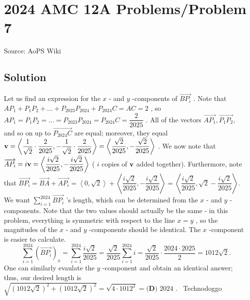 \documentclass[12pt]{article}
\begin{document}
\section*{{2024 AMC 12A Problems/Problem 7}}
Source: AoPS Wiki

\subsection*{Solution}
Let us find an expression for the $x$ - and $y$ -components of $\overrightarrow{BP_i}$ . Note that $AP_1+P_1P_2+\dots+P_{2023}P_{2024}+P_{2024}C=AC=2$ , so $AP_1=P_1P_2=\dots=P_{2023}P_{2024}=P_{2024}C=\dfrac2{2025}$ . All of the vectors $\overrightarrow{AP_1},\overrightarrow{P_1P_2},$ and so on up to $\overrightarrow{P_{2024}C}$ are equal; moreover, they equal $\textbf v=\left\langle\dfrac1{\sqrt2}\cdot\dfrac2{2025},-\dfrac1{\sqrt2}\cdot\dfrac2{2025}\right\rangle=\left\langle\dfrac{\sqrt2}{2025},-\dfrac{\sqrt2}{2025}\right\rangle$ . We now note that $\overrightarrow{AP_i}=i\textbf v=\left\langle\dfrac{i\sqrt2}{2025},-\dfrac{i\sqrt2}{2025}\right\rangle$ ( $i$ copies of $\textbf v$ added together). Furthermore, note that $\overrightarrow{BP_i}=\overrightarrow{BA}+\overrightarrow{AP_i}=\left\langle0,\sqrt2\right\rangle+\left\langle\dfrac{i\sqrt2}{2025},-\dfrac{i\sqrt2}{2025}\right\rangle=\left\langle\dfrac{i\sqrt2}{2025},\sqrt2-\dfrac{i\sqrt2}{2025}\right\rangle.$ We want $\sum_{i=1}^{2024}\overrightarrow{BP_i}$ 's length, which can be determined from the $x$ - and $y$ -components. Note that the two values should actually be the same - in this problem, everything is symmetric with respect to the line $x=y$ , so the magnitudes of the $x$ - and $y$ -components should be identical. The $x$ -component is easier to calculate. \[\sum_{i=1}^{2024}\left(\overrightarrow{BP_i}\right)_x=\sum_{i=1}^{2024}\dfrac{i\sqrt2}{2025}=\dfrac{\sqrt2}{2025}\sum_{i=1}^{2024}i=\dfrac{\sqrt2}{2025}\cdot\dfrac{2024\cdot2025}2=1012\sqrt2.\] One can similarly evaulate the $y$ -component and obtain an identical answer; thus, our desired length is $\sqrt{\left(1012\sqrt2\right)^2+\left(1012\sqrt2\right)^2}=\sqrt{4\cdot1012^2}=\boxed{\textbf{(D) }2024}$ . ~Technodoggo
\end{document}
